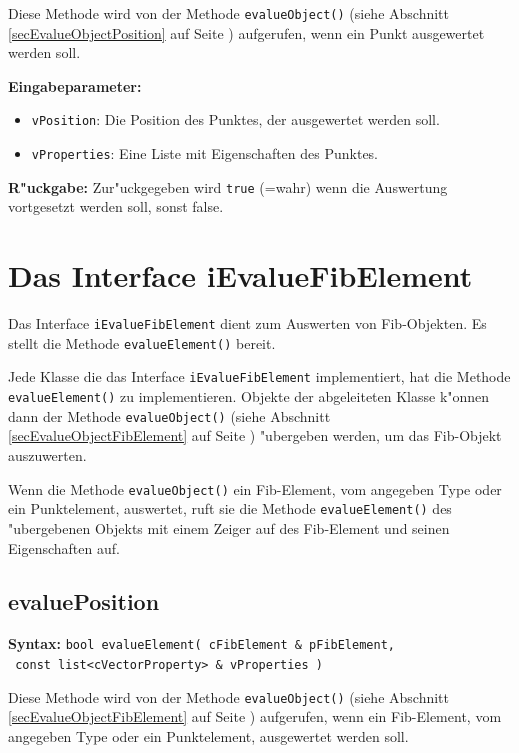 \bigskip\noindent
Diese Methode wird von der Methode \verb|evalueObject()| (siehe Abschnitt \ref{secEvalueObjectPosition} auf Seite \pageref{secEvalueObjectPosition} ) aufgerufen, wenn ein Punkt ausgewertet werden soll.

\bigskip\noindent
\textbf{Eingabeparameter:}
\begin{itemize}
 \item \verb|vPosition|: Die Position des Punktes, der ausgewertet werden soll.
 \item \verb|vProperties|: Eine Liste mit Eigenschaften des Punktes.
\end{itemize}

\bigskip\noindent
\textbf{R"uckgabe:} Zur"uckgegeben wird \verb|true| (=wahr) wenn die Auswertung vortgesetzt werden soll, sonst false.



\section{Das Interface iEvalueFibElement}
\label{secIEvalueFibElement}

Das Interface \verb|iEvalueFibElement| dient zum Auswerten von Fib-Objekten. Es stellt die Methode \verb|evalueElement()| bereit.

Jede Klasse die das Interface \verb|iEvalueFibElement| implementiert, hat die Methode \verb|evalueElement()| zu implementieren. Objekte der abgeleiteten Klasse k"onnen dann der Methode \verb|evalueObject()| (siehe Abschnitt \ref{secEvalueObjectFibElement} auf Seite \pageref{secEvalueObjectFibElement}) "ubergeben werden, um das Fib-Objekt auszuwerten.

Wenn die Methode \verb|evalueObject()| ein Fib-Element, vom angegeben Type oder ein Punktelement, auswertet, ruft sie die Methode \verb|evalueElement()| des "ubergebenen Objekts mit einem Zeiger auf des Fib-Element und seinen Eigenschaften auf.


\subsection{evaluePosition}

\textbf{Syntax:} \verb|bool evalueElement( cFibElement & pFibElement,| \\\verb| const list<cVectorProperty> & vProperties )|

\bigskip\noindent
Diese Methode wird von der Methode \verb|evalueObject()| (siehe Abschnitt \ref{secEvalueObjectFibElement} auf Seite \pageref{secEvalueObjectFibElement} ) aufgerufen, wenn ein Fib-Element, vom angegeben Type oder ein Punktelement, ausgewertet werden soll.

